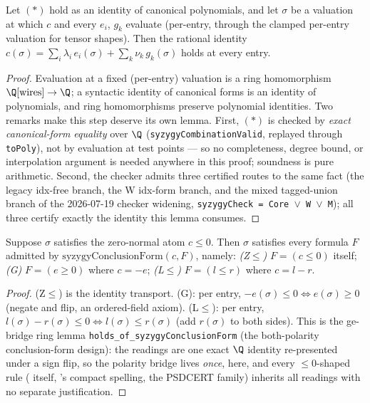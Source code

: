 \begin{blemma}\label{lem:syz-eval}
Let $(\ast)$ hold as an identity of canonical polynomials, and let
$\sigma$ be a valuation at which $c$ and every $e_i$, $g_k$ evaluate
(per-entry, through the clamped per-entry valuation for tensor shapes).
Then the rational identity
$c(\sigma) = \sum_i \lambda_i\, e_i(\sigma) + \sum_k \nu_k\, g_k(\sigma)$
holds at every entry.
\end{blemma}
\begin{proof}
Evaluation at a fixed (per-entry) valuation is a ring homomorphism
$\Q[\text{wires}] \to \Q$; a syntactic identity of canonical forms is an
identity of polynomials, and ring homomorphisms preserve polynomial
identities. Two remarks make this step deserve its own lemma. First,
$(\ast)$ is checked by \emph{exact canonical-form equality} over $\Q$
(\texttt{syzygyCombinationValid}, replayed through \texttt{toPoly}), not by
evaluation at test points --- so no completeness, degree bound, or
interpolation argument is needed anywhere in this proof; soundness is pure
arithmetic. Second, the checker admits three certified routes to the same
fact (the legacy idx-free branch, the W idx-form branch, and the mixed
tagged-union branch of the 2026-07-19 checker widening,
\texttt{syzygyCheck = Core $\vee$ W $\vee$ M}); all three certify exactly
the identity this lemma consumes.
\end{proof}

\begin{blemma}\label{lem:syz-transport}
Suppose $\sigma$ satisfies the zero-normal atom $c \leq 0$. Then $\sigma$
satisfies every formula $F$ admitted by
$\mathrm{syzygyConclusionForm}(c, F)$, namely:
\emph{(Z$\leq$)} $F = (c \leq 0)$ itself;
\emph{(G)} $F = (e \geq 0)$ where $c = -e$;
\emph{(L$\leq$)} $F = (l \leq r)$ where $c = l - r$.
\end{blemma}
\begin{proof}
(Z$\leq$) is the identity transport. (G): per entry,
$-e(\sigma) \leq 0 \iff e(\sigma) \geq 0$ (negate and flip, an ordered-field
axiom). (L$\leq$): per entry, $l(\sigma) - r(\sigma) \leq 0 \iff l(\sigma)
\leq r(\sigma)$ (add $r(\sigma)$ to both sides). This is the ge-bridge ring
lemma \texttt{holds\_of\_syzygyConclusionForm} (the both-polarity
conclusion-form design): the readings are one exact $\Q$ identity
re-presented under a sign flip, so the polarity bridge lives \emph{once},
here, and every $\leq 0$-shaped rule ( itself,
's compact spelling, the PSDCERT family) inherits all
readings with no separate justification.
\end{proof}

